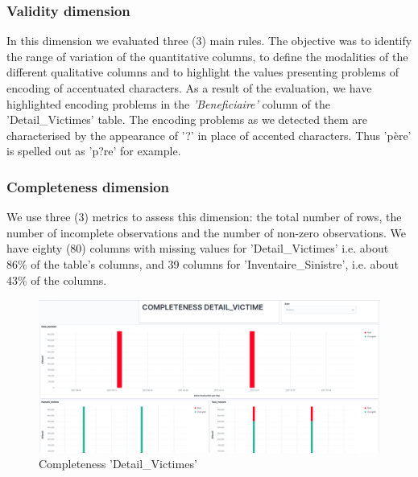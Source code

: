 \subsubsection{Validity dimension}
In this dimension we evaluated three (3) main rules. The objective was to identify the range of variation of the quantitative columns, to define the modalities of the different qualitative columns and to highlight the values presenting problems of encoding of accentuated characters. As a result of the evaluation,  we have highlighted encoding problems in the \textit{'Beneficiaire'} column of the 'Detail\_Victimes' table. The encoding problems as we detected them are characterised by the appearance of '?' in place of accented characters. Thus 'p\`ere' is spelled out as 'p?re' for example.

\subsubsection{Completeness dimension}
We use three (3) metrics to assess this dimension: the total number of rows, the number of incomplete observations and the number of non-zero observations. We have eighty (80) columns with missing values for 'Detail\_Victimes'  i.e. about 86\% of the table's columns, and 39 columns for 'Inventaire\_Sinistre', i.e. about 43\% of the columns.

\begin{figure}[H]
    \caption{Completeness 'Detail\_Victimes'}  \label{fig:xray}
    \begin{center}
      \includegraphics[scale=0.27]{Main/Static/Completeness_Detail_Victime.png} 
    \end{center}
\end{figure}



